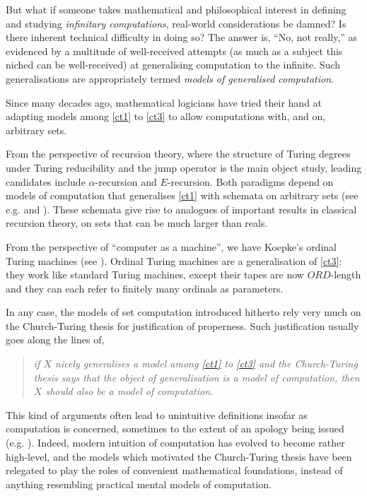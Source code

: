 \documentclass[12pt]{article}
\numberwithin{equation}{section}
\begin{document}
But what if someone takes mathematical and philosophical interest in defining and studying \textit{infinitary computations}, real-world considerations be damned? Is there inherent technical difficulty in doing so? The answer is, ``No, not really,'' as evidenced by a multitude of well-received attempts (as much as a subject this niched can be well-received) at generalising computation to the infinite. Such generalisations are appropriately termed \textit{models of generalised computation}.

Since many decades ago, mathematical logicians have tried their hand at adapting models among \ref{ct1} to \ref{ct3} to allow computations with, and on, arbitrary sets.

From the perspective of recursion theory, where the structure of Turing degrees under Turing reducibility and the jump operator is the main object study, leading candidates include $\alpha$-recursion and $E$-recursion. Both paradigms depend on models of computation that generalises \ref{ct1} with schemata on arbitrary sets (see e.g. \cite{takeuti} and \cite{normann}). These schemata give rise to analogues of important results in classical recursion theory, on sets that can be much larger than reals. 

From the perspective of ``computer as a machine'', we have Koepke's ordinal Turing machines (see \cite{koepke1}). Ordinal Turing machines are a generalisation of \ref{ct3}: they work like standard Turing machines, except their tapes are now $ORD$-length and they can each refer to finitely many ordinals as parameters. 

In any case, the models of set computation introduced hitherto rely very much on the Church-Turing thesis for justification of properness. Such justification usually goes along the lines of,
\begin{quote}
    \emph{if $X$ nicely generalises a model among \ref{ct1} to \ref{ct3} and the Church-Turing thesis says that the object of generalisation is a model of computation, then $X$ should also be a model of computation.}
\end{quote}
This kind of arguments often lead to unintuitive definitions insofar as computation is concerned, sometimes to the extent of an apology being issued (e.g. \cite{sackserec}). Indeed, modern intuition of computation has evolved to become rather high-level, and the models which motivated the Church-Turing thesis have been relegated to play the roles of convenient mathematical foundations, instead of anything resembling practical mental models of computation.
\end{document}
